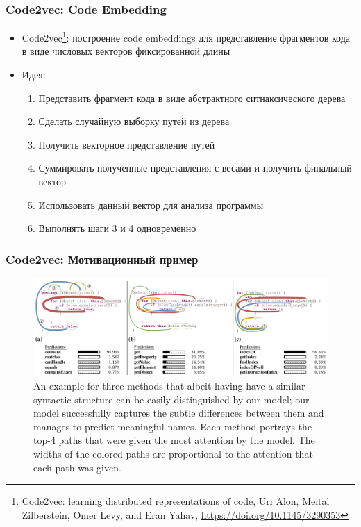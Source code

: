 \documentclass[xcolor=table,english]{beamer}
\begin{document}
\begin{frame}[fragile] \frametitle{Code2vec: Code Embedding}
    \begin{itemize}
        \item Code2vec\footnote{Code2vec: learning distributed representations of code, Uri Alon, Meital Zilberstein, Omer Levy, and Eran Yahav, \href{https://doi.org/10.1145/3290353}{https://doi.org/10.1145/3290353}}: построение code embeddings для представление фрагментов кода 
        в виде числовых векторов фиксированной длины
        \item Идея:
        {
            \begin{enumerate}
                \item Представить фрагмент кода в виде абстрактного ситнаксического дерева
                \item Сделать случайную выборку путей из дерева
                \item Получить векторное представление путей
                \item Суммировать полученные представления с весами и получить финальный вектор
                \item Использовать данный вектор для анализа программы
                \item Выполнять шаги 3 и 4 одновременно 
            \end{enumerate}
        }
    \end{itemize}
\end{frame}

\begin{frame}[fragile] \frametitle{Code2vec: Мотивационный пример}
    \begin{minipage}[m]{\linewidth}
        \begin{figure}
            \centering
            \includegraphics[width=\textwidth]{figures/code2vec_motivation_example.png}
            \caption{An example for three methods that albeit having have a similar syntactic structure can be easily distinguished by our model; our model successfully captures the subtle differences between them and manages to predict meaningful names. Each method portrays the top-4 paths that were given the most attention by the model. The widths of the colored paths are proportional to the attention that each path was given.}
        \end{figure}
    \end{minipage}\hfill
\end{frame}
\end{document}
